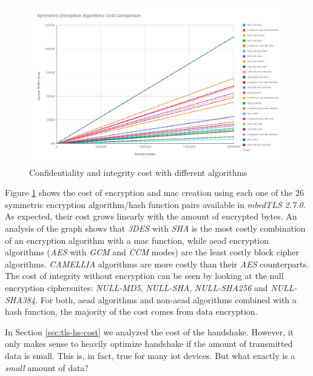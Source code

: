 \begin{figure}
  \centering
  \includegraphics[width=1.0\textwidth]{img/sym_algs_cc.png}
  \centering \caption{\label{fig:symm-encr-all} Confidentiality and integrity cost with different algorithms}
\end{figure}

Figure \ref{fig:symm-encr-all} shows the cost of encryption and \gls{mac} creation using each one of the $26$ symmetric encryption 
algorithm/hash function pairs available in \textit{mbedTLS 2.7.0}. As expected, their cost grows linearly with the amount of encrypted bytes.
An analysis of the graph shows that \textit{3DES} with \textit{SHA} is the most costly combination of an encryption algorithm with a \gls{mac} function, 
while \gls{aead} encryption algorithms 
(\textit{AES} with \textit{GCM} and \textit{CCM} modes) are the least costly block cipher algorithms. 
\textit{CAMELLIA} algorithms are more costly than their \textit{AES} counterparts.  The cost of integrity without encryption can be seen by looking at the null
encryption ciphersuites: \textit{NULL-MD5}, \textit{NULL-SHA}, \textit{NULL-SHA256} and \textit{NULL-SHA384}.
For both, \gls{aead} algorithms and non-\gls{aead} algorithms combined with a hash function, the majority of the cost comes from data encryption.

In Section \ref{sec:tls-hs-cost} we analyzed the cost of the handshake. However, it only makes sense to heavily optimize handshake
if the amount of transmitted data is small. This is, in fact, true for many \gls{iot} devices. But what exactly is a \textit{small} amount of data?

